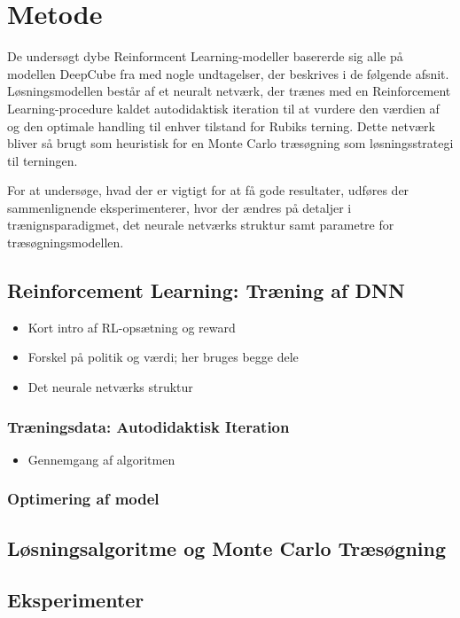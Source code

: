 \documentclass[../main.tex]{subfiles}
\begin{document}
\chapter{Metode}
De undersøgt dybe Reinformcent Learning-modeller basererde sig alle på modellen DeepCube fra \cite{HumansBeGone} med nogle undtagelser, der beskrives i de følgende afsnit. Løsningsmodellen består af et neuralt netværk, der trænes med en Reinforcement Learning-procedure kaldet autodidaktisk iteration til at vurdere den værdien af og den optimale handling til enhver tilstand for Rubiks terning. Dette netværk bliver så brugt som heuristisk for en Monte Carlo træsøgning som løsningsstrategi til terningen.

For at undersøge, hvad der er vigtigt for at få gode resultater, udføres der sammenlignende eksperimenterer, hvor der ændres på detaljer i trænignsparadigmet, det neurale netværks struktur samt parametre for træsøgningsmodellen.

\section{Reinforcement Learning: Træning af DNN}

\begin{itemize}
	\item Kort intro af RL-opsætning og reward
	\item Forskel på politik og værdi; her bruges begge dele
	\item Det neurale netværks struktur
\end{itemize}

\subsection{Træningsdata: Autodidaktisk Iteration}


\begin{itemize}
	\item Gennemgang af algoritmen
\end{itemize}

\subsection{Optimering af model}




\section{Løsningsalgoritme og Monte Carlo Træsøgning}

\section{Eksperimenter}
\end{document}
